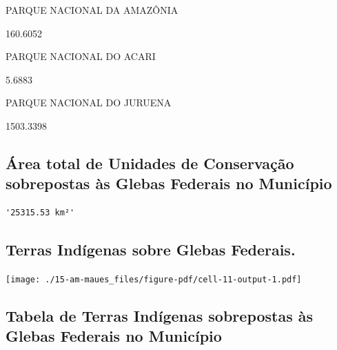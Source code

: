 \documentclass[
  letterpaper,
]{report}
\begin{document}
PARQUE NACIONAL DA AMAZÔNIA

\n      

160.6052

\n    

\n    

\n      

PARQUE NACIONAL DO ACARI

\n      

5.6883

\n    

\n    

\n      

PARQUE NACIONAL DO JURUENA

\n      

1503.3398

\n    

\n  

\n

\hypertarget{uxe1rea-total-de-unidades-de-conservauxe7uxe3o-sobrepostas-uxe0s-glebas-federais-no-municuxedpio}{%
\subsection{Área total de Unidades de Conservação sobrepostas às Glebas
Federais no
Município}\label{uxe1rea-total-de-unidades-de-conservauxe7uxe3o-sobrepostas-uxe0s-glebas-federais-no-municuxedpio}}

\begin{verbatim}
'25315.53 km²'
\end{verbatim}

\hypertarget{terras-induxedgenas-sobre-glebas-federais.}{%
\subsection{Terras Indígenas sobre Glebas
Federais.}\label{terras-induxedgenas-sobre-glebas-federais.}}

\texttt{[image: ./15-am-maues\_files/figure-pdf/cell-11-output-1.pdf]}

\hypertarget{tabela-de-terras-induxedgenas-sobrepostas-uxe0s-glebas-federais-no-municuxedpio}{%
\subsection{Tabela de Terras Indígenas sobrepostas às Glebas Federais no
Município}\label{tabela-de-terras-induxedgenas-sobrepostas-uxe0s-glebas-federais-no-municuxedpio}}

\n  
\end{document}
